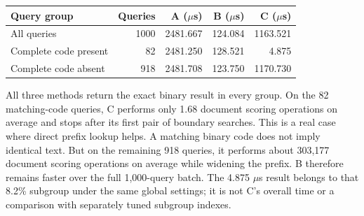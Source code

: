 \begin{center}\small
\begin{tabular}{@{}lrrrr@{}}\toprule
Query group & Queries & A ($\mu$s) & B ($\mu$s) & C ($\mu$s)\\\midrule
All queries & 1000 & 2481.667 & 124.084 & 1163.521\\
Complete code present & 82 & 2481.250 & 128.521 & 4.875\\
Complete code absent & 918 & 2481.708 & 123.750 & 1170.730\\\bottomrule
\end{tabular}
\end{center}
All three methods return the exact binary result in every group. On the 82 matching-code queries, C performs only 1.68 document scoring operations on average and stops after its first pair of boundary searches. This is a real case where direct prefix lookup helps. A matching binary code does not imply identical text. But on the remaining 918 queries, it performs about 303,177 document scoring operations on average while widening the prefix. B therefore remains faster over the full 1,000-query batch. The 4.875 $\mu$s result belongs to that 8.2\% subgroup under the same global settings; it is not C's overall time or a comparison with separately tuned subgroup indexes.
